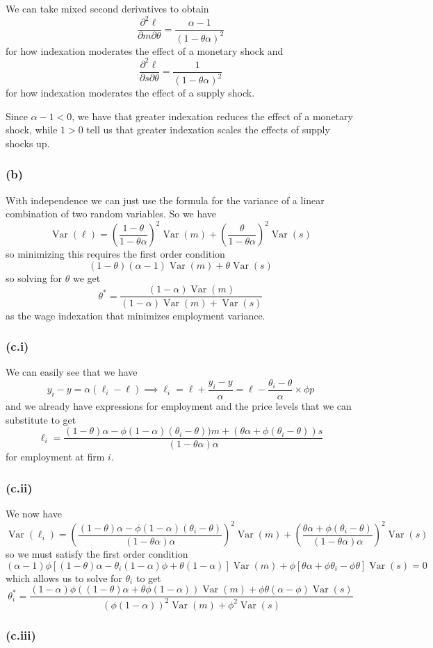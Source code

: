 \documentclass[11pt]{amsart}
\begin{document}
We can take mixed second derivatives to obtain
\[
\frac{\partial^2 \ell}{\partial m \partial \theta} = \frac{\alpha - 1}{(1-\theta \alpha)^2}
\]
for how indexation moderates the effect of a monetary shock and
\[
\frac{\partial^2 \ell}{\partial s \partial \theta} = \frac{1}{(1-\theta \alpha)^2}
\]
for how indexation moderates the effect of a supply shock.

Since $\alpha - 1 < 0$, we have that greater indexation reduces the effect of a monetary shock, while $1 > 0$ tell us that greater indexation scales the effects of supply shocks up.

\subsubsection*{(b)}

With independence we can just use the formula for the variance of a linear combination of two random variables. So we have
\[
\operatorname{Var}(\ell) = \left(\frac{1-\theta}{1-\theta \alpha}\right)^2 \operatorname{Var}(m) + \left(\frac{\theta}{1-\theta \alpha}\right)^2 \operatorname{Var}(s)
\]
so minimizing this requires the first order condition
\[
(1-\theta)(\alpha-1) \operatorname{Var}(m) + \theta \operatorname{Var}(s)
\]
so solving for $\theta$ we get
\[
\theta^* = \frac{(1-\alpha) \operatorname{Var}(m)}{(1-\alpha) \operatorname{Var}(m) + \operatorname{Var}(s)}
\]
as the wage indexation that minimizes employment variance.

\subsubsection*{(c.i)}

We can easily see that we have
\[
y_i - y = \alpha (\ell_i - \ell) \implies \ell_i = \ell + \frac{y_i - y}{\alpha} = \ell - \frac{\theta_i - \theta}{\alpha} \times \phi p
\]
and we already have expressions for employment and the price levels that we can substitute to get
\[
\ell_i = \frac{(1-\theta) \alpha - \phi (1-\alpha) (\theta_i - \theta)) m + (\theta \alpha + \phi (\theta_i - \theta)) s}{(1-\theta \alpha) \alpha}
\]
for employment at firm $i$.

\subsubsection*{(c.ii)}

We now have
\[
\operatorname{Var}(\ell_i) = \left(\frac{(1-\theta) \alpha - \phi (1-\alpha) (\theta_i - \theta)}{(1-\theta \alpha) \alpha}\right)^2 \operatorname{Var}(m) + \left(\frac{\theta \alpha + \phi (\theta_i - \theta)}{(1-\theta \alpha) \alpha}\right)^2 \operatorname{Var}(s)
\]
so we must satisfy the first order condition
\[
(\alpha - 1) \phi [(1-\theta) \alpha - \theta_i (1-\alpha) \phi + \theta (1-\alpha)] \operatorname{Var}(m) + \phi[\theta \alpha + \phi \theta_i - \phi \theta] \operatorname{Var}(s) = 0
\]
which allows us to solve for $\theta_i$ to get
\[
\theta_i^* = \frac{(1-\alpha) \phi ((1-\theta)\alpha + \theta \phi (1-\alpha)) \operatorname{Var}(m) + \phi \theta(\alpha - \phi) \operatorname{Var}(s)}{(\phi(1-\alpha))^2 \operatorname{Var}(m) + \phi^2 \operatorname{Var}(s)}
\]

\subsubsection*{(c.iii)}
\end{document}
